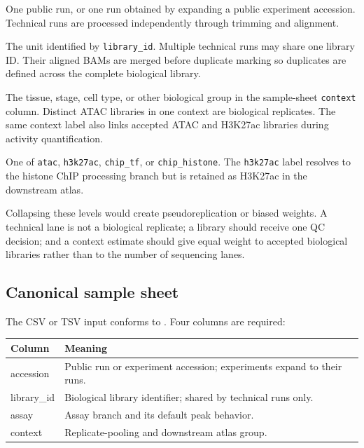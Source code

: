 \documentclass[11pt]{article}
\newcommand{\filep}[1]{\path{#1}}
\begin{document}
\begin{description}[style=nextline,leftmargin=2.2em]
  \item[Accession or technical run]
  One public run, or one run obtained by expanding a public experiment
  accession.  Technical runs are processed independently through trimming and
  alignment.

  \item[Biological library]
  The unit identified by \texttt{library\_id}.  Multiple technical runs may
  share one library ID.  Their aligned BAMs are merged before duplicate
  marking so duplicates are defined across the complete biological library.

  \item[Context]
  The tissue, stage, cell type, or other biological group in the sample-sheet
  \texttt{context} column.  Distinct ATAC libraries in one context are
  biological replicates.  The same context label also links accepted ATAC and
  H3K27ac libraries during activity quantification.

  \item[Assay]
  One of \texttt{atac}, \texttt{h3k27ac}, \texttt{chip\_tf}, or
  \texttt{chip\_histone}.  The \texttt{h3k27ac} label resolves to the histone
  ChIP processing branch but is retained as H3K27ac in the downstream atlas.
\end{description}

Collapsing these levels would create pseudoreplication or biased weights.  A
technical lane is not a biological replicate; a library should receive one
QC decision; and a context estimate should give equal weight to accepted
biological libraries rather than to the number of sequencing lanes.

\subsection{Canonical sample sheet}

The CSV or TSV input conforms to
\filep{schemas/sample-sheet.schema.yaml}.  Four columns are required:

\begin{center}
\begin{tabularx}{0.94\textwidth}{>{\ttfamily}l X}
\toprule
\normalfont Column & Meaning \\
\midrule
accession & Public run or experiment accession; experiments expand to their runs. \\
library\_id & Biological library identifier; shared by technical runs only. \\
assay & Assay branch and its default peak behavior. \\
context & Replicate-pooling and downstream atlas group. \\
\bottomrule
\end{tabularx}
\end{center}
\end{document}
